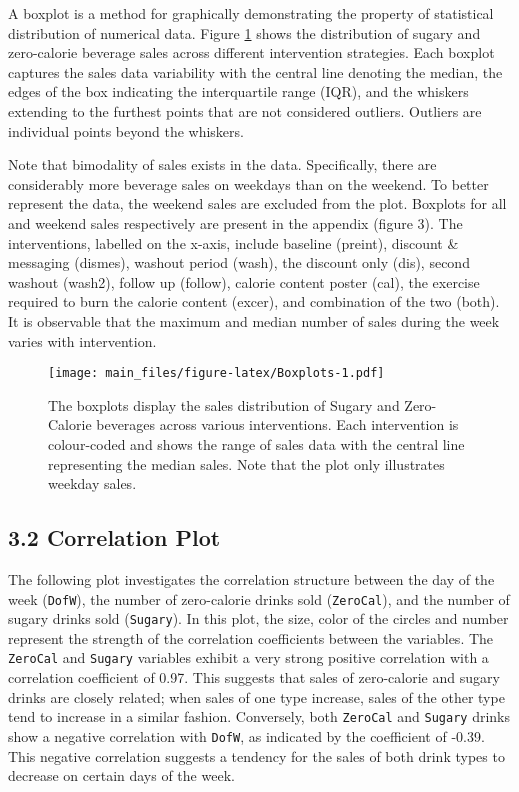 \documentclass[
]{article}
\begin{document}
A boxplot is a method for graphically demonstrating the property of statistical distribution of numerical data. Figure \ref{fig:Boxplots} shows the distribution of sugary and zero-calorie beverage sales across different intervention strategies. Each boxplot captures the sales data variability with the central line denoting the median, the edges of the box indicating the interquartile range (IQR), and the whiskers extending to the furthest points that are not considered outliers. Outliers are individual points beyond the whiskers.

Note that bimodality of sales exists in the data. Specifically, there are considerably more beverage sales on weekdays than on the weekend. To better represent the data, the weekend sales are excluded from the plot. Boxplots for all and weekend sales respectively are present in the appendix (figure 3). The interventions, labelled on the x-axis, include baseline (preint), discount \& messaging (dismes), washout period (wash), the discount only (dis), second washout (wash2), follow up (follow), calorie content poster (cal), the exercise required to burn the calorie content (excer), and combination of the two (both). It is observable that the maximum and median number of sales during the week varies with intervention.

\begin{figure}
\centering
\texttt{[image: main\_files/figure-latex/Boxplots-1.pdf]}
\caption{\label{fig:Boxplots}The boxplots display the sales distribution of Sugary and Zero-Calorie beverages across various interventions. Each intervention is colour-coded and shows the range of sales data with the central line representing the median sales. Note that the plot only illustrates weekday sales.}
\end{figure}

\hypertarget{correlation-plot}{%
\subsection{3.2 Correlation Plot}\label{correlation-plot}}

The following plot investigates the correlation structure between the day of the week (\texttt{DofW}), the number of zero-calorie drinks sold (\texttt{ZeroCal}), and the number of sugary drinks sold (\texttt{Sugary}). In this plot, the size, color of the circles and number represent the strength of the correlation coefficients between the variables. The \texttt{ZeroCal} and \texttt{Sugary} variables exhibit a very strong positive correlation with a correlation coefficient of 0.97. This suggests that sales of zero-calorie and sugary drinks are closely related; when sales of one type increase, sales of the other type tend to increase in a similar fashion. Conversely, both \texttt{ZeroCal} and \texttt{Sugary} drinks show a negative correlation with \texttt{DofW}, as indicated by the coefficient of -0.39. This negative correlation suggests a tendency for the sales of both drink types to decrease on certain days of the week.
\end{document}
